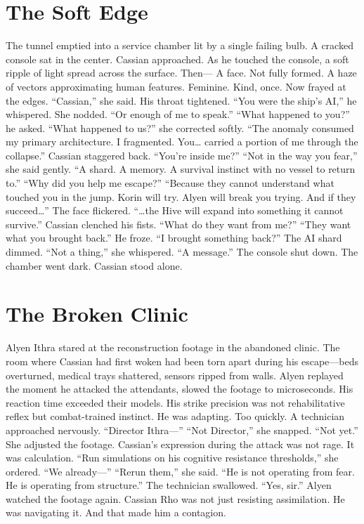 \documentclass[12pt,oneside]{book}
\begin{document}

\chapter{The Soft Edge}

The tunnel emptied into a service chamber lit by a single failing bulb. A cracked console sat in the center. Cassian approached.
As he touched the console, a soft ripple of light spread across the surface.
Then—
A face.
Not fully formed. A haze of vectors approximating human features. Feminine. Kind, once. Now frayed at the edges.
“Cassian,” she said.
His throat tightened.
“You were the ship’s AI,” he whispered.
She nodded.
“Or enough of me to speak.”
“What happened to you?” he asked.
“What happened to us?” she corrected softly. “The anomaly consumed my primary architecture. I fragmented. You… carried a portion of me through the collapse.”
Cassian staggered back.
“You’re inside me?”
“Not in the way you fear,” she said gently. “A shard. A memory. A survival instinct with no vessel to return to.”
“Why did you help me escape?”
“Because they cannot understand what touched you in the jump. Korin will try. Alyen will break you trying. And if they succeed…”
 The face flickered.
 “…the Hive will expand into something it cannot survive.”
Cassian clenched his fists.
“What do they want from me?”
“They want what you brought back.”
He froze.
“I brought something back?”
The AI shard dimmed.
“Not a thing,” she whispered. “A message.”
The console shut down.
The chamber went dark.
Cassian stood alone.



\chapter{The Broken Clinic}

Alyen Ithra stared at the reconstruction footage in the abandoned clinic.
The room where Cassian had first woken had been torn apart during his escape—beds overturned, medical trays shattered, sensors ripped from walls.
Alyen replayed the moment he attacked the attendants, slowed the footage to microseconds. His reaction time exceeded their models. His strike precision was not rehabilitative reflex but combat-trained instinct.
He was adapting.
Too quickly.
A technician approached nervously.
“Director Ithra—”
“Not Director,” she snapped. “Not yet.”
She adjusted the footage. Cassian’s expression during the attack was not rage.
It was calculation.
“Run simulations on his cognitive resistance thresholds,” she ordered.
“We already—”
“Rerun them,” she said. “He is not operating from fear. He is operating from structure.”
The technician swallowed. “Yes, sir.”
Alyen watched the footage again.
Cassian Rho was not just resisting assimilation.
He was navigating it.
And that made him a contagion.
\end{document}
